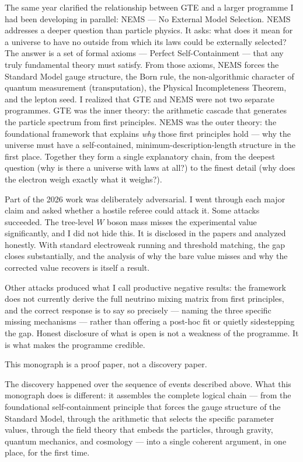 \documentclass[11pt,openany]{book}
\theoremstyle{remark}
\begin{document}
The same year clarified the relationship between GTE and a larger programme I had been
developing in parallel: NEMS --- No External Model Selection.
NEMS addresses a deeper question than particle physics.
It asks: what does it mean for a universe to have no outside from which its laws could be
externally selected?
The answer is a set of formal axioms --- Perfect Self-Containment --- that any truly
fundamental theory must satisfy.
From those axioms, NEMS forces the Standard Model gauge structure, the Born rule, the
non-algorithmic character of quantum measurement (transputation), the Physical Incompleteness
Theorem, and the lepton seed.
I realized that GTE and NEMS were not two separate programmes.
GTE was the inner theory: the arithmetic cascade that generates the particle spectrum from
first principles.
NEMS was the outer theory: the foundational framework that explains \emph{why} those first
principles hold --- why the universe must have a self-contained, minimum-description-length
structure in the first place.
Together they form a single explanatory chain, from the deepest question (why is there a
universe with laws at all?) to the finest detail (why does the electron weigh exactly what
it weighs?).

Part of the 2026 work was deliberately adversarial.
I went through each major claim and asked whether a hostile referee could attack it.
Some attacks succeeded.
The tree-level $W$ boson mass misses the experimental value significantly, and I did not
hide this.
It is disclosed in the papers and analyzed honestly.
With standard electroweak running and threshold matching, the gap closes substantially,
and the analysis of why the bare value misses and why the corrected value recovers is
itself a result.

Other attacks produced what I call productive negative results: the framework does not
currently derive the full neutrino mixing matrix from first principles, and the correct
response is to say so precisely --- naming the three specific missing mechanisms ---
rather than offering a post-hoc fit or quietly sidestepping the gap.
Honest disclosure of what is open is not a weakness of the programme.
It is what makes the programme credible.

\medskip

This monograph is a proof paper, not a discovery paper.

The discovery happened over the sequence of events described above.
What this monograph does is different: it assembles the complete logical chain --- from
the foundational self-containment principle that forces the gauge structure of the
Standard Model, through the arithmetic that selects the specific parameter values, through
the field theory that embeds the particles, through gravity, quantum mechanics, and
cosmology --- into a single coherent argument, in one place, for the first time.
\end{document}
